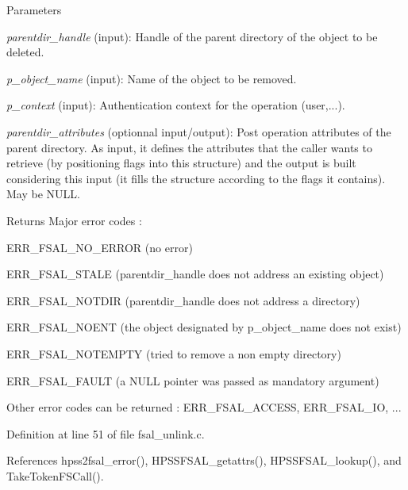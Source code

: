 \begin{DoxyParams}{Parameters}
\item[{\em parentdir\_\-handle}](input): Handle of the parent directory of the object to be deleted. \item[{\em p\_\-object\_\-name}](input): Name of the object to be removed. \item[{\em p\_\-context}](input): Authentication context for the operation (user,...). \item[{\em parentdir\_\-attributes}](optionnal input/output): Post operation attributes of the parent directory. As input, it defines the attributes that the caller wants to retrieve (by positioning flags into this structure) and the output is built considering this input (it fills the structure according to the flags it contains). May be NULL.\end{DoxyParams}
\begin{DoxyReturn}{Returns}
Major error codes :
\begin{DoxyItemize}
\item ERR\_\-FSAL\_\-NO\_\-ERROR (no error)
\item ERR\_\-FSAL\_\-STALE (parentdir\_\-handle does not address an existing object)
\item ERR\_\-FSAL\_\-NOTDIR (parentdir\_\-handle does not address a directory)
\item ERR\_\-FSAL\_\-NOENT (the object designated by p\_\-object\_\-name does not exist)
\item ERR\_\-FSAL\_\-NOTEMPTY (tried to remove a non empty directory)
\item ERR\_\-FSAL\_\-FAULT (a NULL pointer was passed as mandatory argument)
\item Other error codes can be returned : ERR\_\-FSAL\_\-ACCESS, ERR\_\-FSAL\_\-IO, ... 
\end{DoxyItemize}
\end{DoxyReturn}


Definition at line 51 of file fsal\_\-unlink.c.

References hpss2fsal\_\-error(), HPSSFSAL\_\-getattrs(), HPSSFSAL\_\-lookup(), and TakeTokenFSCall().
